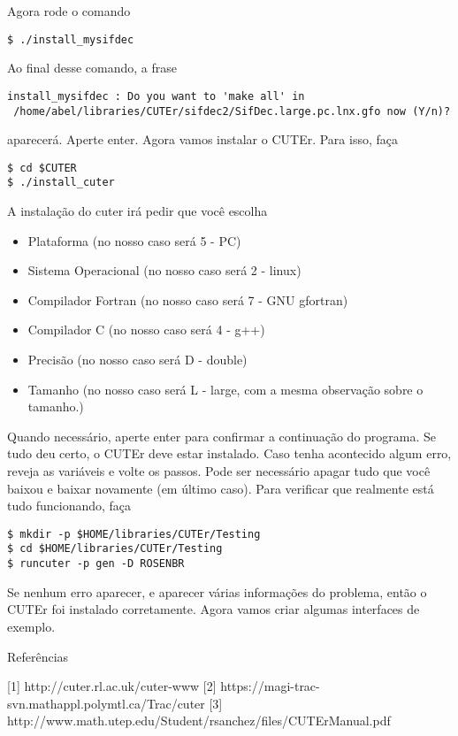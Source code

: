 \documentclass[letterpaper,11pt]{article}
\numberwithin{equation}{section}
\begin{document}
Agora rode o comando
\begin{verbatim}
$ ./install_mysifdec
\end{verbatim}
Ao final desse comando, a frase
\begin{verbatim}
install_mysifdec : Do you want to 'make all' in
 /home/abel/libraries/CUTEr/sifdec2/SifDec.large.pc.lnx.gfo now (Y/n)?
\end{verbatim}
aparecerá. Aperte enter. Agora vamos instalar o CUTEr. Para isso, faça
\begin{verbatim}
$ cd $CUTER
$ ./install_cuter
\end{verbatim}
A instalação do cuter irá pedir que você escolha
\begin{itemize}
 \item Plataforma (no nosso caso será 5 - PC)
 \item Sistema Operacional (no nosso caso será 2 - linux)
 \item Compilador Fortran (no nosso caso será 7 - GNU gfortran)
 \item Compilador C (no nosso caso será 4 - g++)
 \item Precisão (no nosso caso será D - double)
 \item Tamanho (no nosso caso será L - large, com a mesma observação sobre o tamanho.)
\end{itemize}
Quando necessário, aperte enter para confirmar a continuação do programa. Se tudo deu
certo, o CUTEr deve estar instalado. Caso tenha acontecido algum erro, reveja as variáveis
e volte os passos. Pode ser necessário apagar tudo que você baixou e baixar novamente (em 
último caso). Para verificar que realmente está tudo funcionando, faça
\begin{verbatim}
$ mkdir -p $HOME/libraries/CUTEr/Testing
$ cd $HOME/libraries/CUTEr/Testing
$ runcuter -p gen -D ROSENBR
\end{verbatim}
Se nenhum erro aparecer, e aparecer várias informações do problema, então o
CUTEr foi instalado corretamente. Agora vamos criar algumas interfaces de exemplo.


Referências

[1] http://cuter.rl.ac.uk/cuter-www 
[2] https://magi-trac-svn.mathappl.polymtl.ca/Trac/cuter 
[3] http://www.math.utep.edu/Student/rsanchez/files/CUTErManual.pdf
\end{document}
